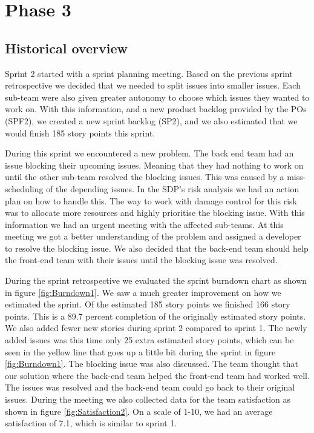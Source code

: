 \documentclass{article}
\begin{document}
\section{Phase 3} %
\subsection{Historical overview}
Sprint 2 started with a sprint planning meeting. Based on the previous sprint retrospective we decided that we needed to split issues into smaller issues. Each sub-team were also given greater autonomy to choose which issues they wanted to work on. With this information, and a new product backlog provided by the POs (SPF2), we created a new sprint backlog (SP2), and we also estimated that we would finish 185 story points this sprint. 

During this sprint we encountered a new problem. The back end team had an issue blocking their upcoming issues. Meaning that they had nothing to work on until the other sub-team resolved the blocking issues. This was caused by a miss-scheduling of the depending issues. In the SDP's risk analysis we had an action plan on how to handle this. The way to work with damage control for this risk was to allocate more resources and highly prioritise the blocking issue. With this information we had an urgent meeting with the affected sub-teams. At this meeting we got a better understanding of the problem and assigned a developer to resolve the blocking issue. We also decided that the back-end team should help the front-end team with their issues until the blocking issue was resolved. 

During the sprint retrospective we evaluated the sprint burndown chart as shown in figure \ref{fig:Burndown1}. We saw a much greater improvement on how we estimated the sprint. Of the estimated 185 story points we finished 166 story points. This is a 89.7 percent completion of the originally estimated story points. We also added fewer new stories during sprint 2 compared to sprint 1. The newly added issues was this time only 25 extra estimated story points, which can be seen in the yellow line that goes up a little bit during the sprint in figure \ref{fig:Burndown1}. The blocking issue was also discussed. The team thought that our solution where the back-end team helped the front-end team had worked well. The issues was resolved and the back-end team could go back to their original issues. During the meeting we also collected data for the team satisfaction as shown in figure \ref{fig:Satisfaction2}. On a scale of 1-10, we had an average satisfaction of 7.1, which is similar to sprint 1.
\end{document}
